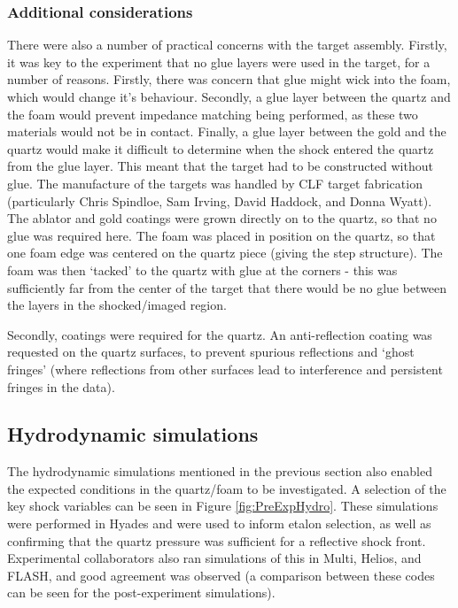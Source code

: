 \subsubsection{Additional considerations}

There were also a number of practical concerns with the target assembly. Firstly, it was key to the experiment that no glue layers were used in the target, for a number of reasons. Firstly, there was concern that glue might wick into the foam, which would change it's behaviour. Secondly, a glue layer between the quartz and the foam would prevent impedance matching being performed, as these two materials would not be in contact. Finally, a glue layer between the gold and the quartz would make it difficult to determine when the shock entered the quartz from the glue layer. This meant that the target had to be constructed without glue. The manufacture of the targets was handled by CLF target fabrication (particularly Chris Spindloe, Sam Irving, David Haddock, and Donna Wyatt). The ablator and gold coatings were grown directly on to the quartz, so that no glue was required here. The foam was placed in position on the quartz, so that one foam edge was centered on the quartz piece (giving the step structure). The foam was then `tacked' to the quartz with glue at the corners - this was sufficiently far from the center of the target that there would be no glue between the layers in the shocked/imaged region.

Secondly, coatings were required for the quartz. An anti-reflection coating was requested on the quartz surfaces, to prevent spurious reflections and `ghost fringes' (where reflections from other surfaces lead to interference and persistent fringes in the data).

\subsection{Hydrodynamic simulations}

The hydrodynamic simulations mentioned in the previous section also enabled the expected conditions in the quartz/foam to be investigated. A selection of the key shock variables can be seen in Figure \ref{fig:PreExpHydro}. These simulations were performed in Hyades and were used to inform etalon selection, as well as confirming that the quartz pressure was sufficient for a reflective shock front. Experimental collaborators also ran simulations of this in Multi, Helios, and FLASH, and good agreement was observed (a comparison between these codes can be seen for the post-experiment simulations).


